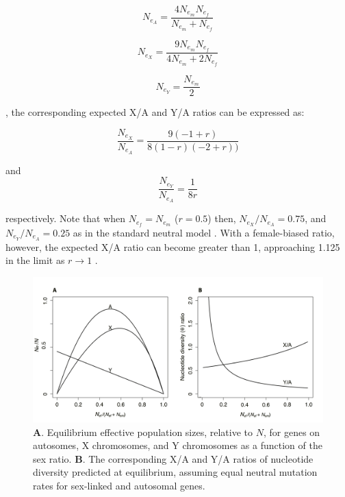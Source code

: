 \documentclass[9pt,twocolumn,twoside]{gsajnl}
\begin{document}
\begin{equation}
N_{e_{A}} = \frac{4N_{e}_{m}N_{e}_{f}}{N_{e}_{m}+N_{e}_{f}} \label{eq:NeA}
\end{equation}

\begin{equation}
N_{e_{X}} = \frac{9N_{e}_{m}N_{e}_{f}}{4N_{e}_{m}+2N_{e}_{f}} \label{eq:NeX}
\end{equation}

\begin{equation}
N_{e_{Y}} = \frac{N_{e}_{m}}{2} \label{eq:NeY}
\end{equation}

\citep{wright1931evolution}, the corresponding expected X/A and Y/A ratios can be expressed as:

\begin{equation}
\frac{N_{e_{X}}}{N_{e_{A}}} = \frac{9 (-1 + r)}{8 (1 - r) (-2 + r))} \label{eq:XA}
\end{equation}

and
\begin{equation}
\frac{N_{e_{Y}}}{N_{e_{A}}} = \frac{1}{8r} \label{eq:YA}
\end{equation}

respectively.  Note that when $N_{e}_{f} = N_{e}_{m}$ ($r=0.5$) then, $N_{e_{X}}/N_{e_{A}} = 0.75$, and $N_{e_{Y}}/N_{e_{A}} = 0.25$ as in the standard neutral model \citep{wright1931evolution}. With a female-biased ratio, however, the expected X/A ratio can become greater than 1, approaching 1.125 in the limit as $r\rightarrow 1$ \citep{caballero1995}.

\begin{figure}[htbp]
\centering
\noindent
\includegraphics[width=\linewidth]{figure1.jpg}
\caption{\textbf{A}. Equilibrium effective population sizes, relative to $N$, for genes on autosomes, X chromosomes, and Y chromosomes as a function of the sex ratio. \textbf{B}. The corresponding X/A and Y/A ratios of nucleotide diversity predicted at equilibrium, assuming equal neutral mutation rates for sex-linked and autosomal genes.
}
\end{figure}
\end{document}
